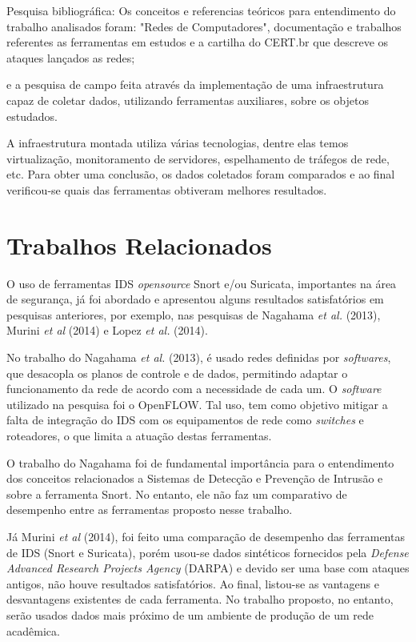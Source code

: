 \begin{alineas}
\item Pesquisa bibliográfica: Os conceitos e referencias teóricos para entendimento do trabalho analisados foram: "Redes de Computadores", documentação e trabalhos referentes as ferramentas em estudos e a cartilha do CERT.br que descreve os ataques lançados as redes;
\item e a pesquisa de campo feita através da implementação de uma infraestrutura capaz de coletar dados, utilizando ferramentas auxiliares, sobre os objetos estudados.
\end{alineas}

A infraestrutura montada utiliza várias tecnologias, dentre elas temos virtualização, monitoramento de servidores, espelhamento de tráfegos de rede, etc. Para obter uma conclusão, os dados coletados foram comparados e ao final verificou-se quais das ferramentas obtiveram melhores resultados.

\section{Trabalhos Relacionados} \label{sec:trabalhos-relacionados}

O uso de ferramentas IDS \textit{opensource} Snort e/ou Suricata, importantes na área de segurança, já foi abordado e apresentou alguns resultados satisfatórios em pesquisas anteriores, por exemplo, nas pesquisas de Nagahama \textit{et al.} (2013), Murini \textit{et al} (2014) e Lopez \textit{et al.} (2014). 

No trabalho do Nagahama \textit{et al.} (2013), é usado redes definidas por \textit{softwares}, que desacopla os planos de controle e de dados, permitindo adaptar o funcionamento da rede de acordo com a necessidade de cada um. O \textit{software} utilizado na pesquisa foi o OpenFLOW. Tal uso, tem como objetivo mitigar a falta de integração do IDS com os equipamentos de rede como \textit{switches} e roteadores, o que limita a atuação destas ferramentas. 

O trabalho do Nagahama foi de fundamental importância para o entendimento dos conceitos relacionados a Sistemas de Detecção e Prevenção de Intrusão e sobre a ferramenta Snort. No entanto, ele não faz um comparativo de desempenho entre as ferramentas proposto nesse trabalho.

Já Murini \textit{et al} (2014), foi feito uma comparação de desempenho das ferramentas de IDS (Snort e Suricata), porém usou-se dados sintéticos fornecidos pela \textit{Defense Advanced Research Projects Agency} (DARPA) e devido ser uma base com ataques antigos, não houve resultados satisfatórios. Ao final, listou-se as vantagens e desvantagens existentes de cada ferramenta. No trabalho proposto, no entanto, serão usados dados mais próximo de um ambiente de produção de um rede acadêmica. 

